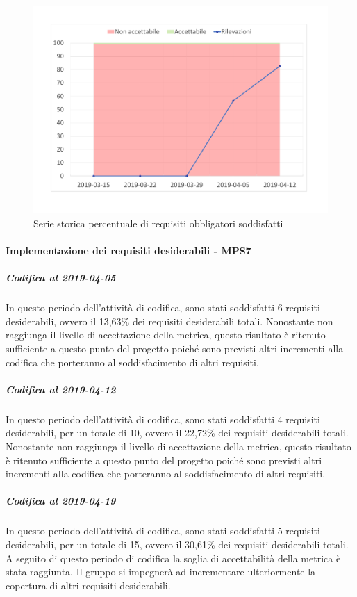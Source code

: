 \begin{figure}[H]
	\centering
	\includegraphics[scale=0.6]{images/resoconto/MPS6Chart.pdf}
	\caption{Serie storica percentuale di requisiti obbligatori soddisfatti}	
\end{figure}

\paragraph{Implementazione dei requisiti desiderabili - MPS7}
\subparagraph{Codifica al 2019-04-05}
In questo periodo dell'attività di codifica, sono stati soddisfatti 6 requisiti desiderabili, ovvero il 13,63\% dei requisiti desiderabili totali.
Nonostante non raggiunga il livello di accettazione della
metrica, questo risultato è ritenuto sufficiente a questo punto del progetto poiché sono previsti altri incrementi alla codifica che porteranno al soddisfacimento di altri requisiti.

\subparagraph{Codifica al 2019-04-12}
In questo periodo dell'attività di codifica, sono stati soddisfatti 4 requisiti desiderabili, per un totale di 10, ovvero il 22,72\% dei requisiti desiderabili totali.
Nonostante non raggiunga il livello di accettazione della
metrica, questo risultato è ritenuto sufficiente a questo punto del progetto poiché sono previsti altri incrementi alla codifica che porteranno al soddisfacimento di altri requisiti.

\subparagraph{Codifica al 2019-04-19}
In questo periodo dell'attività di codifica, sono stati soddisfatti 5 requisiti desiderabili, per un totale di 15, ovvero il 30,61\% dei requisiti desiderabili totali.
A seguito di questo periodo di codifica la soglia di accettabilità della metrica è stata raggiunta.
Il gruppo si impegnerà ad incrementare ulteriormente la copertura di altri requisiti desiderabili.


